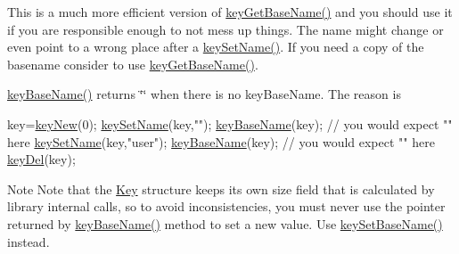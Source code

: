 This is a much more efficient version of \hyperlink{group__keyname_ga0992d26bcfca767cb8e77053a483eb64}{key\-Get\-Base\-Name()} and you should use it if you are responsible enough to not mess up things. The name might change or even point to a wrong place after a \hyperlink{group__keyname_ga7699091610e7f3f43d2949514a4b35d9}{key\-Set\-Name()}. If you need a copy of the basename consider to use \hyperlink{group__keyname_ga0992d26bcfca767cb8e77053a483eb64}{key\-Get\-Base\-Name()}.

\hyperlink{group__keyname_gaaff35e7ca8af5560c47e662ceb9465f5}{key\-Base\-Name()} returns \char`\"{}\char`\"{} when there is no key\-Base\-Name. The reason is 
\begin{DoxyCode}
key=\hyperlink{group__key_gaf6893c038b3ebee90c73a9ea8356bebf}{keyNew}(0);
\hyperlink{group__keyname_ga7699091610e7f3f43d2949514a4b35d9}{keySetName}(key,\textcolor{stringliteral}{""});
\hyperlink{group__keyname_gaaff35e7ca8af5560c47e662ceb9465f5}{keyBaseName}(key); \textcolor{comment}{// you would expect "" here}
\hyperlink{group__keyname_ga7699091610e7f3f43d2949514a4b35d9}{keySetName}(key,\textcolor{stringliteral}{"user"});
\hyperlink{group__keyname_gaaff35e7ca8af5560c47e662ceb9465f5}{keyBaseName}(key); \textcolor{comment}{// you would expect "" here}
\hyperlink{group__key_ga3df95bbc2494e3e6703ece5639be5bb1}{keyDel}(key);
\end{DoxyCode}


\begin{DoxyNote}{Note}
Note that the \hyperlink{classkdb_1_1Key}{Key} structure keeps its own size field that is calculated by library internal calls, so to avoid inconsistencies, you must never use the pointer returned by \hyperlink{group__keyname_gaaff35e7ca8af5560c47e662ceb9465f5}{key\-Base\-Name()} method to set a new value. Use \hyperlink{group__keyname_ga6e804bd453f98c28b0ff51430d1df407}{key\-Set\-Base\-Name()} instead.
\end{DoxyNote}

